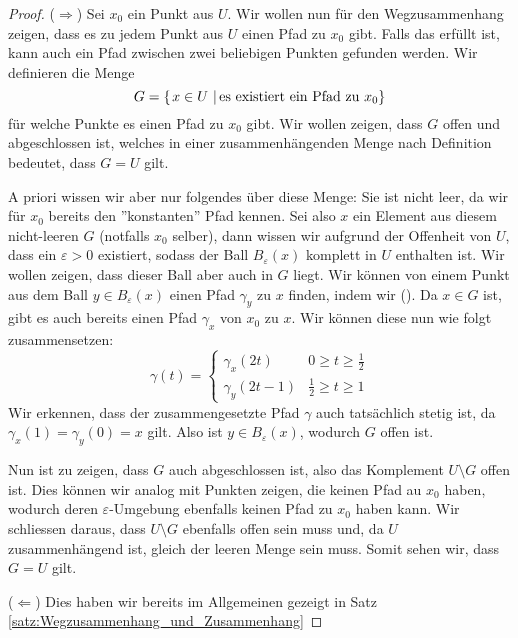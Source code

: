 \begin{proof}
($\Longrightarrow$) Sei $x_0$ ein Punkt aus $U$. Wir wollen nun für den Wegzusammenhang zeigen, dass es zu jedem Punkt aus $U$ einen Pfad zu $x_0$ gibt. Falls das erfüllt ist, kann auch ein Pfad zwischen zwei beliebigen Punkten gefunden werden. Wir definieren die Menge$$G = \left\{\left.x \in U \ \right| \text{es existiert ein Pfad zu }x_0 \right\}$$ für welche Punkte es einen Pfad zu $x_0$ gibt. Wir wollen zeigen, dass $G$ offen und abgeschlossen ist, welches in einer zusammenhängenden Menge nach Definition bedeutet, dass $G = U$ gilt.

A priori wissen wir aber nur folgendes über diese Menge: Sie ist nicht leer, da wir für $x_0$ bereits den ''konstanten'' Pfad kennen. Sei also $x$ ein Element aus diesem nicht-leeren $G$ (notfalls $x_0$ selber), dann wissen wir aufgrund der Offenheit von $U$, dass ein $\varepsilon > 0$ existiert, sodass der Ball $B_\varepsilon(x)$ komplett in $U$ enthalten ist. Wir wollen zeigen, dass dieser Ball aber auch in $G$ liegt. Wir können von einem Punkt aus dem Ball $y \in B_\varepsilon(x)$  einen Pfad $\gamma_y$ zu $x$ finden, indem wir (). Da $x \in G$ ist, gibt es auch bereits einen Pfad $\gamma_x$ von $x_0$ zu $x$. Wir können diese nun wie folgt zusammensetzen:
$$\gamma(t) = \begin{cases} \gamma_x(2t) & 0 \geq t \geq \frac{1}{2} \\ \gamma_y(2t-1) & \frac{1}{2} \geq t \geq 1\end{cases}$$
Wir erkennen, dass der zusammengesetzte Pfad $\gamma$ auch tatsächlich stetig ist, da $\gamma_x(1) = \gamma_y(0) = x$ gilt. Also ist $y \in B_\varepsilon(x)$, wodurch $G$ offen ist.

Nun ist zu zeigen, dass $G$ auch abgeschlossen ist, also das Komplement $U \setminus G$ offen ist. Dies können wir analog mit Punkten zeigen, die keinen Pfad au $x_0$ haben, wodurch deren $\varepsilon$-Umgebung ebenfalls keinen Pfad zu $x_0$ haben kann. Wir schliessen daraus, dass $U\setminus G$ ebenfalls offen sein muss und, da $U$ zusammenhängend ist, gleich der leeren Menge sein muss. Somit sehen wir, dass $G = U$ gilt.

($\Longleftarrow$) Dies haben wir bereits im Allgemeinen gezeigt in Satz \ref{satz:Wegzusammenhang_und_Zusammenhang}
\end{proof}

